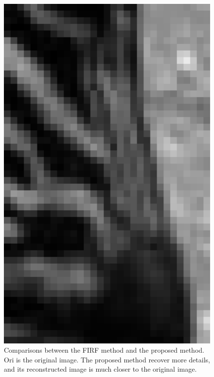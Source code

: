 \documentclass[review,numbers,sort&compress]{elsarticle}  %
\begin{document}
\begin{figure}[t]
{\begin{minipage}[b]{0.15\textwidth}
                \includegraphics[width=1\textwidth]{compareImage/ORI_zebra_mag_G_2.png}
            \end{minipage}
        }
    \caption{Comparisons between the FIRF method and the proposed method. Ori is the original image. The proposed method recover more details, and its reconstructed image is much closer to the original image.}
    \label{fig:zebra_gray}
\end{figure}
\end{document}
